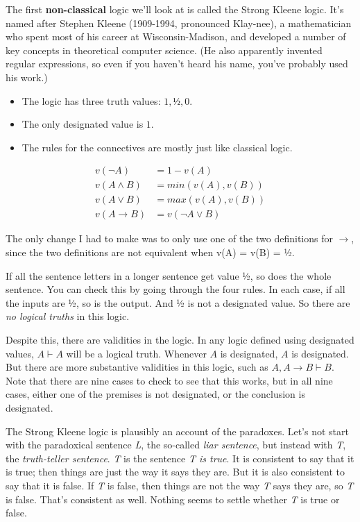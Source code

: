 \documentclass[
]{article}
\providecommand{\tightlist}{%
  \setlength{\itemsep}{0pt}\setlength{\parskip}{0pt}}\usepackage{longtable,booktabs,array}
\begin{document}
The first \textbf{non-classical} logic we'll look at is called the
Strong Kleene logic. It's named after Stephen Kleene (1909-1994,
pronounced Klay-nee), a mathematician who spent most of his career at
Wisconsin-Madison, and developed a number of key concepts in theoretical
computer science. (He also apparently invented regular expressions, so
even if you haven't heard his name, you've probably used his work.)

\begin{itemize}
\tightlist
\item
  The logic has three truth values: \(1, ½, 0\).
\item
  The only designated value is \(1\).
\item
  The rules for the connectives are mostly just like classical logic.
\end{itemize}

\begin{align*}
v(\neg A) &= 1 - v(A) \\
v(A \wedge B) &= min(v(A), v(B)) \\
v(A \vee B) &= max(v(A), v(B)) \\
v(A \rightarrow B) &= v(\neg A \vee B)
\end{align*}

The only change I had to make was to only use one of the two definitions
for \(\rightarrow\), since the two definitions are not equivalent when
v(A) = v(B) = ½.

If all the sentence letters in a longer sentence get value ½, so does
the whole sentence. You can check this by going through the four rules.
In each case, if all the inputs are ½, so is the output. And ½ is not a
designated value. So there are \emph{no logical truths} in this logic.

Despite this, there are validities in the logic. In any logic defined
using designated values, \(A \vdash A\) will be a logical truth.
Whenever \(A\) is designated, \(A\) is designated. But there are more
substantive validities in this logic, such as
\(A, A \rightarrow B \vdash B\). Note that there are nine cases to check
to see that this works, but in all nine cases, either one of the
premises is not designated, or the conclusion is designated.

The Strong Kleene logic is plausibly an account of the paradoxes. Let's
not start with the paradoxical sentence \emph{L}, the so-called
\emph{liar sentence}, but instead with \emph{T}, the \emph{truth-teller
sentence}. \emph{T} is the sentence \emph{T is true}. It is consistent
to say that it is true; then things are just the way it says they are.
But it is also consistent to say that it is false. If \emph{T} is false,
then things are not the way \emph{T} says they are, so \emph{T} is
false. That's consistent as well. Nothing seems to settle whether
\emph{T} is true or false.
\end{document}
